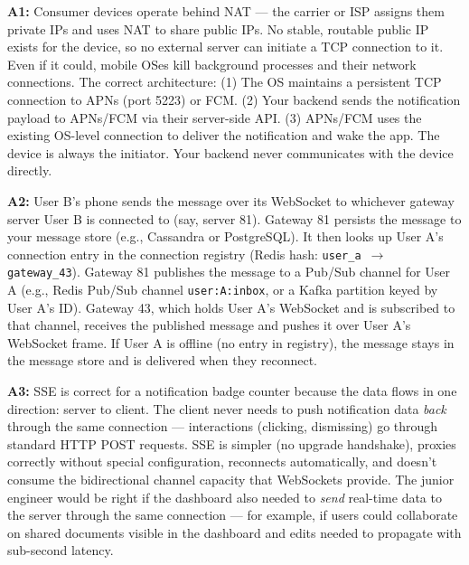 \documentclass[11pt,a4paper]{article}
\begin{document}
\newpage
\begin{answerbox}
\textbf{A1:} Consumer devices operate behind NAT --- the carrier or ISP assigns them private IPs and uses NAT to share public IPs. No stable, routable public IP exists for the device, so no external server can initiate a TCP connection to it. Even if it could, mobile OSes kill background processes and their network connections. The correct architecture: (1) The OS maintains a persistent TCP connection to APNs (port 5223) or FCM. (2) Your backend sends the notification payload to APNs/FCM via their server-side API. (3) APNs/FCM uses the existing OS-level connection to deliver the notification and wake the app. The device is always the initiator. Your backend never communicates with the device directly.

\vspace{8pt}

\textbf{A2:} User B's phone sends the message over its WebSocket to whichever gateway server User B is connected to (say, server 81). Gateway 81 persists the message to your message store (e.g., Cassandra or PostgreSQL). It then looks up User A's connection entry in the connection registry (Redis hash: \texttt{user\_a $\to$ gateway\_43}). Gateway 81 publishes the message to a Pub/Sub channel for User A (e.g., Redis Pub/Sub channel \texttt{user:A:inbox}, or a Kafka partition keyed by User A's ID). Gateway 43, which holds User A's WebSocket and is subscribed to that channel, receives the published message and pushes it over User A's WebSocket frame. If User A is offline (no entry in registry), the message stays in the message store and is delivered when they reconnect.

\vspace{8pt}

\textbf{A3:} SSE is correct for a notification badge counter because the data flows in one direction: server to client. The client never needs to push notification data \emph{back} through the same connection --- interactions (clicking, dismissing) go through standard HTTP POST requests. SSE is simpler (no upgrade handshake), proxies correctly without special configuration, reconnects automatically, and doesn't consume the bidirectional channel capacity that WebSockets provide. The junior engineer would be right if the dashboard also needed to \emph{send} real-time data to the server through the same connection --- for example, if users could collaborate on shared documents visible in the dashboard and edits needed to propagate with sub-second latency.


\end{answerbox}
\end{document}
